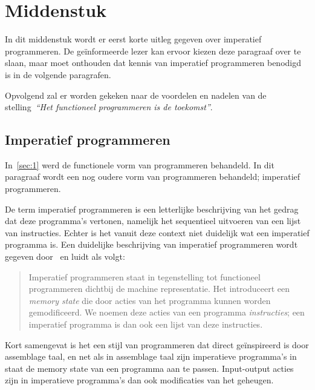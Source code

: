 \documentclass[twoside,twocolumn]{article}
\begin{document}
\section{Middenstuk}
\label{sec:2}

In dit middenstuk wordt er eerst korte uitleg gegeven over imperatief
programmeren. De ge\"informeerde lezer kan ervoor kiezen deze paragraaf over te
slaan, maar moet onthouden dat kennis van imperatief programmeren benodigd is
in de volgende paragrafen.

Opvolgend zal er worden gekeken naar de voordelen en nadelen van de
stelling~\textit{``Het functioneel programmeren is de toekomst''}.


\subsection{Imperatief programmeren}
\label{subsec:2-1}

In~\cref{sec:1} werd de functionele vorm van programmeren behandeld. In dit
paragraaf wordt een nog oudere vorm van programmeren behandeld; imperatief
programmeren.

De term imperatief programmeren is een letterlijke beschrijving van het gedrag
dat deze programma's vertonen, namelijk het sequentieel uitvoeren van een lijst
van instructies. Echter is het vanuit deze context niet duidelijk wat een
imperatief programma is. Een duidelijke beschrijving van imperatief
programmeren wordt gegeven door~\textcite[hfdst.~3]{src6} en luidt als volgt:

\begin{quote}
  Imperatief programmeren staat in tegenstelling tot functioneel programmeren
  dichtbij de machine representatie. Het introduceert een \textit{memory state}
  die door acties van het programma kunnen worden gemodificeerd. We noemen deze
  acties van een programma \textit{instructies}; een imperatief programma is
  dan ook een lijst van deze instructies.
\end{quote}

Kort samengevat is het een stijl van programmeren dat direct ge\"inspireerd is
door assemblage taal, en net als in assemblage taal zijn
imperatieve programma's in staat de memory state van een programma aan te
passen. Input-output acties zijn in imperatieve programma's dan ook
modificaties van het geheugen.

\end{document}
